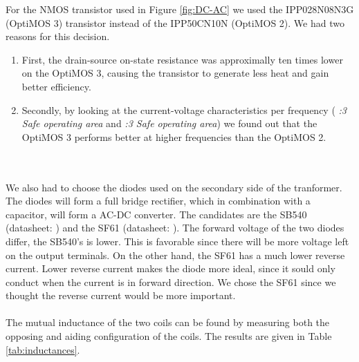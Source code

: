 \documentclass[final]{scrreprt} %
\begin{document}
For the NMOS transistor used in Figure \ref{fig:DC-AC} we used the IPP028N08N3G (OptiMOS 3) transistor instead of the IPP50CN10N (OptiMOS 2).
We had two reasons for this decision.
\begin{enumerate}
\item First, the drain-source on-state resistance was approximally ten times lower on the OptiMOS 3, causing the transistor to generate less heat and gain better efficiency.
\item Secondly, by looking at the current-voltage characteristics per frequency (\cite{OptiMOS2} \emph{:3 Safe operating area} and \cite{OptiMOS3} \emph{:3 Safe operating area}) we found out that the OptiMOS 3 performs better at higher frequencies than the OptiMOS 2.
\end{enumerate}


\\ \\
We also had to choose the diodes used on the secondary side of the tranformer. The diodes will form a full bridge rectifier, which in combination with a capacitor, will form a AC-DC converter.
The candidates are the SB540 (datasheet: \cite{SB540}) and the SF61 (datasheet: \cite{SF61}).
The forward voltage of the two diodes differ, the SB540's is lower. This is favorable since there will be more voltage left on the output terminals.
On the other hand, the SF61 has a much lower reverse current. Lower reverse current makes the diode more ideal, since it sould only conduct when the current is in forward direction.
We chose the SF61 since we thought the reverse current would be more important.
\\ \\


The mutual inductance of the two coils can be found by measuring both the opposing and aiding configuration of the coils. The results are given in Table \ref{tab:inductances}.
\end{document}
